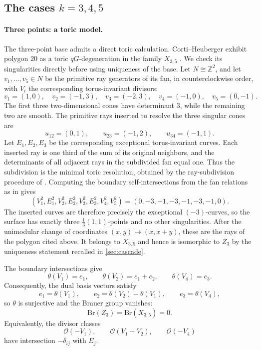 \documentclass[11pt]{article}
\theoremstyle{plain}
\theoremstyle{definition}
\theoremstyle{remark}
\newcommand{\Z}{\mathbb Z}
\newcommand{\Br}{\mathrm{Br}}
\newcommand{\OO}{\mathcal O}
\begin{document}
\subsection{\texorpdfstring{The cases \(k=3,4,5\)}{The cases k=3,4,5}}
\label{app:brauer-unobstructed}


\paragraph{Three points: a toric model.}
The three-point base admits a direct toric calculation.
\label{app:brauer-three}
Corti--Heuberger exhibit polygon \(20\) as a toric \(qG\)-degeneration in the
family \(X_{3,5}\)
\cite[Section~7, Table~4 and Figure~11]{Corti2016}. We check its
singularities directly before using uniqueness of the base. Let
\(N\cong\Z^2\), and let
\(v_1,\dots,v_5\in N\) be the primitive ray generators of its fan, in
counterclockwise order, with \(V_i\) the corresponding torus-invariant
divisors:
\[
v_1=(1,0),\quad
v_2=(-1,3),\quad
v_3=(-2,3),\quad
v_4=(-1,0),\quad
v_5=(0,-1).
\]
The first three two-dimensional cones have determinant \(3\), while the
remaining two are smooth. The primitive rays inserted to resolve the three
singular cones are
\[
u_{12}=(0,1),\qquad
u_{23}=(-1,2),\qquad
u_{34}=(-1,1).
\]
Let \(E_1,E_2,E_3\) be the corresponding exceptional torus-invariant
curves. Each inserted ray is one third of the sum of its original
neighbors, and the determinants of all adjacent rays in the subdivided
fan equal one. Thus the subdivision is the minimal toric resolution,
obtained by the ray-subdivision procedure of
\cite[Chapters~10--11]{CoxLittleSchenck2011}. Computing the boundary
self-intersections from the fan relations as in
\cite[Theorem~10.4.4]{CoxLittleSchenck2011} gives
\[
(V_1^2,E_1^2,V_2^2,E_2^2,V_3^2,E_3^2,V_4^2,V_5^2)
=
(0,-3,-1,-3,-1,-3,-1,0).
\]
The inserted curves are therefore precisely the exceptional \((-3)\)-curves,
so the surface has exactly three \(\frac13(1,1)\)-points and no other
singularities.
After the unimodular change of coordinates
\((x,y)\mapsto(x,x+y)\), these are the rays of the polygon cited above.
It belongs to \(X_{3,5}\) and hence is isomorphic to \(Z_3\) by the
uniqueness statement recalled in \cref{sec:cascade}.

The boundary intersections give
\[
\theta(V_1)=e_1,\qquad
\theta(V_2)=e_1+e_2,\qquad
\theta(V_4)=e_3.
\]
Consequently, the dual basis vectors satisfy
\[
e_1=\theta(V_1),\qquad
e_2=\theta(V_2)-\theta(V_1),\qquad
e_3=\theta(V_4),
\]
so \(\theta\) is surjective and the Brauer group vanishes:
\[
\Br(Z_3)=\Br(X_{3,5})=0.
\]
Equivalently, the divisor classes
\[
\OO(-V_1),\qquad
\OO(V_1-V_2),\qquad
\OO(-V_4)
\]
have intersection \(-\delta_{ij}\) with \(E_j\).
\end{document}
